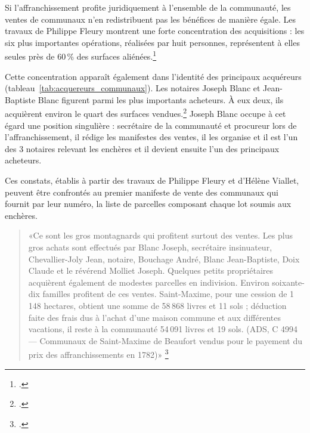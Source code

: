\documentclass[12pt,a4paper]{report}
\begin{document}
Si l'affranchissement profite juridiquement à l'ensemble de la communauté, les ventes de communaux n'en redistribuent pas les bénéfices de manière égale. Les travaux de Philippe Fleury montrent une forte concentration des acquisitions : les six plus importantes opérations, réalisées par huit personnes, représentent à elles seules près de 60\,\% des surfaces aliénées.\footcite[79]{HViallet1993}

Cette concentration apparaît également dans l'identité des principaux acquéreurs (tableau~\ref{tab:acquereurs_communaux}). Les notaires Joseph Blanc et Jean-Baptiste Blanc figurent parmi les plus importants acheteurs. À eux deux, ils acquièrent environ le quart des surfaces vendues.\footcite[79]{HViallet1993} Joseph Blanc occupe à cet égard une position singulière : secrétaire de la communauté et procureur lors de l'affranchissement, il rédige les manifestes des ventes, il les organise et il est l'un des 3 notaires relevant les enchères et il devient ensuite l'un des principaux acheteurs.

Ces constats, établis à partir des travaux de Philippe Fleury et d'Hélène Viallet, peuvent être confrontés au premier manifeste de vente des communaux qui fournit par leur numéro, la liste de parcelles composant chaque lot soumis aux enchères. 



\begin{quote}
	«Ce sont les gros montagnards qui profitent surtout des ventes. Les plus gros achats sont effectués par Blanc Joseph, secrétaire insinuateur, Chevallier-Joly Jean, notaire, Bouchage André, Blanc Jean-Baptiste, Doix Claude et le révérend Molliet Joseph. Quelques petits propriétaires acquièrent également de modestes parcelles en indivision. Environ soixante-dix familles profitent de ces ventes. Saint-Maxime, pour une cession de 1\,148 hectares, obtient une somme de 58\,868 livres et 11 sols ; déduction faite des frais dus à l’achat d’une maison commune et aux différentes vacations, il reste à la communauté 54\,091 livres et 19 sols. (ADS, C 4994 — Communaux de Saint-Maxime de Beaufort vendus pour le payement du prix des affranchissements en 1782)»
	\footcite[127]{BordeVibertGuigue1971VieRuraleBeaufort}
\end{quote}
\end{document}

